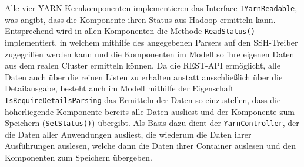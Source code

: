 Alle vier YARN-Kernkomponenten implementieren das Interface \texttt{IYarnReadable}, was angibt, dass die Komponente ihren Status aus Hadoop ermitteln kann. Entsprechend wird in allen Komponenten die Methode \texttt{ReadStatus()} implementiert, in welchem mithilfe des angegebenen Parsers auf den SSH-Treiber zugegriffen werden kann und die Komponenten im Modell so ihre eigenen Daten aus dem realen Cluster ermitteln können. Da die REST-API ermöglicht, alle Daten auch über die reinen Listen zu erhalten anstatt ausschließlich über die Detailausgabe, besteht auch im Modell mithilfe der Eigenschaft \texttt{IsRequireDetailsParsing} das Ermitteln der Daten so einzustellen, dass die höherliegende Komponente bereits alle Daten ausliest und der Komponente zum Speichern (\texttt{SetStatus()}) übergibt. Als Basis dazu dient der \texttt{YarnController}, der die Daten aller Anwendungen ausliest, die wiederum die Daten ihrer Ausführungen auslesen, welche dann die Daten ihrer Container auslesen und den Komponenten zum Speichern übergeben.